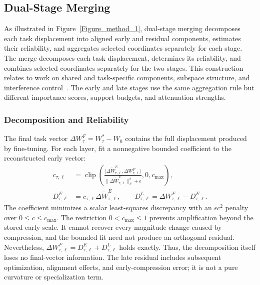 \documentclass[fleqn,10pt]{wlscirep}
\begin{document}
\subsection{Dual-Stage Merging}
\label{subsec:trajectory_merging}
As illustrated in Figure~\ref{Figure_method_1}, dual-stage merging decomposes each task displacement into aligned early and residual components, estimates their reliability, and aggregates selected coordinates separately for each stage. The merge decomposes each task displacement, determines its reliability, and combines selected coordinates separately for the two stages. This construction relates to work on shared and task-specific components, subspace structure, and interference control~\cite{wemoe2024,apgdmerging2025,wudi2025,isotropicmerging2025}. The early and late stages use the same aggregation rule but different importance scores, support budgets, and attenuation strengths.

\subsubsection{Decomposition and Reliability}
\label{subsubsec:final_task_vector}
\label{subsubsec:trajectory_decomposition}
\label{subsubsec:trajectory_alignment}
\label{subsubsec:trajectory_reliability}

The final task vector $\Delta W_{\tau}^{F}=W_{\tau}^{*}-W_0$ contains the full displacement produced by fine-tuning. For each layer, fit a nonnegative bounded coefficient to the reconstructed early vector:
\begin{equation}
\begin{aligned}
c_{\tau,\ell}
&=\operatorname{clip}\!\left(
\frac{\langle\Delta\widetilde W_{\tau,\ell}^{E},
\Delta W_{\tau,\ell}^{F}\rangle}
{\|\Delta\widetilde W_{\tau,\ell}^{E}\|_F^2+\epsilon},
0,c_{\max}\right),\\
D_{\tau,\ell}^{E}
&=c_{\tau,\ell}\Delta\widetilde W_{\tau,\ell}^{E},\qquad
D_{\tau,\ell}^{L}=\Delta W_{\tau,\ell}^{F}-D_{\tau,\ell}^{E}.
\end{aligned}
\label{eq:early_scaling_coefficient}
\end{equation}
The coefficient minimizes a scalar least-squares discrepancy with an $\epsilon c^2$ penalty over $0\leq c\leq c_{\max}$. The restriction $0<c_{\max}\leq1$ prevents amplification beyond the stored early scale. It cannot recover every magnitude change caused by compression, and the bounded fit need not produce an orthogonal residual. Nevertheless, $\Delta W_{\tau,\ell}^{F}=D_{\tau,\ell}^{E}+D_{\tau,\ell}^{L}$ holds exactly. Thus, the decomposition itself loses no final-vector information. The late residual includes subsequent optimization, alignment effects, and early-compression error; it is not a pure curvature or specialization term.
\end{document}
